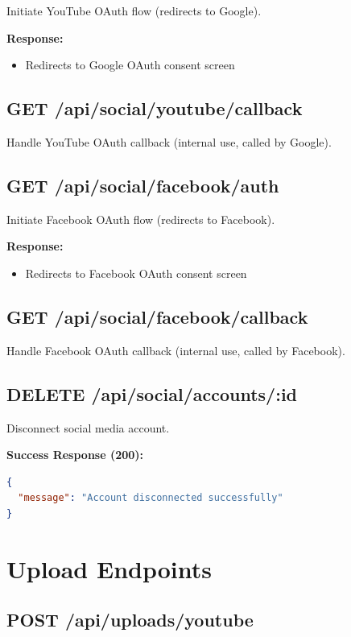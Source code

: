 Initiate YouTube OAuth flow (redirects to Google).

\textbf{Response:}
\begin{itemize}
    \item Redirects to Google OAuth consent screen
\end{itemize}

\subsection{GET /api/social/youtube/callback}

Handle YouTube OAuth callback (internal use, called by Google).

\subsection{GET /api/social/facebook/auth}

Initiate Facebook OAuth flow (redirects to Facebook).

\textbf{Response:}
\begin{itemize}
    \item Redirects to Facebook OAuth consent screen
\end{itemize}

\subsection{GET /api/social/facebook/callback}

Handle Facebook OAuth callback (internal use, called by Facebook).

\subsection{DELETE /api/social/accounts/:id}

Disconnect social media account.

\textbf{Success Response (200):}
\begin{lstlisting}[language=JSON]
{
  "message": "Account disconnected successfully"
}
\end{lstlisting}

\section{Upload Endpoints}

\subsection{POST /api/uploads/youtube}

